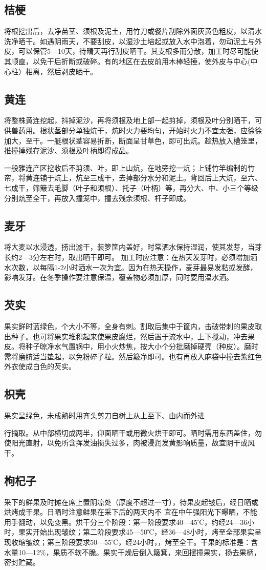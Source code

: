 \documentclass{ctexbook}
\begin{document}
\subsection{桔梗}
将根挖出后，去净苗茎、须根及泥土，用竹刀或餐片刮除外面灰黄色粗皮，以清水洗净晒干。如遇阴雨天，不要刮皮，以湿沙土培起或放入水中泡着，勿动泥土与外皮，可以保管5—10天，待晴天再行刮皮晒干。其支根多而分散，加工时尽可能使其顺直，以免干后折断或破碎。有的地区在去皮前用木棒轻捶，使外皮与中心(中心柱）相离，然后剥皮晒干。
\subsection{黄连}
将整株黄连挖起，抖掉泥沙，再将须根及地上部一起剪掉，须根及叶分别晒干，可供兽药用。根状茎部分单独炕干，炕时火力要均匀，开始时火力不宜太强，应徐徐加大，至干。一艇根状茎容易折断，断面呈甘草色，即可出炕。趁热放入槽笼里，推撞掉残存泥沙、须根及叶柄即得成品。

一般雅连产区挖收后不剪须、叶，即上山炕，在地旁挖一炕；上铺竹竿编制的竹帘，将黄连铺于炕上，炕至三成干，去掉部分水分和泥土。背回后上大炕，至六、七成干，筛簸去毛脚（叶子和须根）、托子（叶柄）等，再分大、中、小三个等级分别炕至全干，再放入撞笼中，撞去残余须根、杆子即成。
\subsection{麦牙}
将大麦以水浸透，捞出滤干，装箩筐内盖好，时常洒水保持湿润，使其发芽，当芽长约2—3分左右时，取出晒干即可。
加工时应注意：在热天发芽时，必须增加洒水次数，以每隔1-2小时洒水一次为宜。因为在热天操作，麦芽最易发粘或发酵，影响发芽。在冬季操作要注意保温，覆盖物必须加厚，同时要用温水洒。
\subsection{芡实}
果实鲜时蓝绿色，个大小不等，全身有刺。割取后集中于筐内，击破带刺的果皮取出种子。也可将果实堆积起来使果皮腐烂，然后置于流水中，上下搅动，冲去果皮。将种子晾净水气置锅中，用小火炒焦，按大小个分批磨掉硬壳（种皮）。磨时需将磨脐适当垫起，以免粉碎子粒。然后簸净即可。也有再放入麻袋中撞去紫红色外衣使成白色的芡实。
\subsection{枳壳}
果实呈绿色，未成熟时用齐头剪刀自树上从上至下、由内而外进

行摘取。从中部横切成两半，仰面晒干或用微火烘干即可。晒时需用东西盖住，勿使阳光直射，以免所含挥发油损失过多，肉被浸润发黄影响质量，故宜阴干或风干。
\subsection{枸杞子}
采下的鲜果及时摊在席上置阴凉处（厚度不超过一寸），待果皮起皱后，经日晒或烘烤成干果。日晒时注意鲜果在采下后的两天内不
宜在中午强阳光下曝晒，不能用手翻动，以免变黑。烘干分三个阶段：第一阶段要求40—45℃，约经24—36小时，果实开始出现皱纹；第二阶段要求45—50℃，经36—48小时，烤至全部果实呈现收缩皱纹；第三阶段要求50—55℃，经24小时，，烤至全干。干果的标准是：含水量10—12\%，果质不软不脆。果实干燥后倒入簸箕，来回摆撞果实，扬去果柄，密封贮藏。
\end{document}

